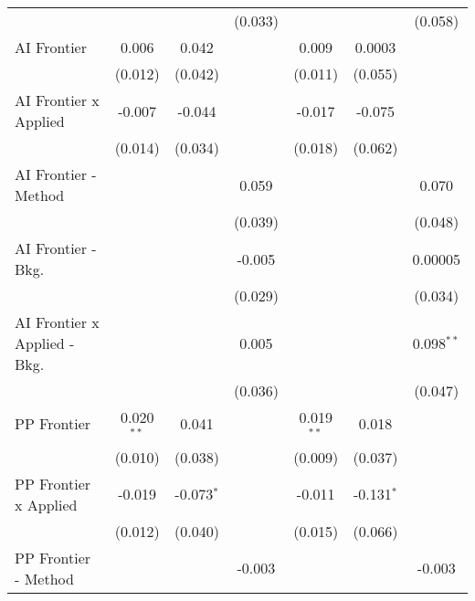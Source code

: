 \begin{tabular}{lcccccc}
                                  &                &               & (0.033)       &                &               & (0.058)\\   
   AI Frontier                    & 0.006          & 0.042         &               & 0.009          & 0.0003        &   \\   
                                  & (0.012)        & (0.042)       &               & (0.011)        & (0.055)       &   \\   
   AI Frontier x Applied          & -0.007         & -0.044        &               & -0.017         & -0.075        &   \\   
                                  & (0.014)        & (0.034)       &               & (0.018)        & (0.062)       &   \\   
   AI Frontier - Method           &                &               & 0.059         &                &               & 0.070\\   
                                  &                &               & (0.039)       &                &               & (0.048)\\   
   AI Frontier - Bkg.             &                &               & -0.005        &                &               & 0.00005\\   
                                  &                &               & (0.029)       &                &               & (0.034)\\   
   AI Frontier x Applied - Bkg.   &                &               & 0.005         &                &               & 0.098$^{**}$\\   
                                  &                &               & (0.036)       &                &               & (0.047)\\   
   PP Frontier                    & 0.020$^{**}$   & 0.041         &               & 0.019$^{**}$   & 0.018         &   \\   
                                  & (0.010)        & (0.038)       &               & (0.009)        & (0.037)       &   \\   
   PP Frontier x Applied          & -0.019         & -0.073$^{*}$  &               & -0.011         & -0.131$^{*}$  &   \\   
                                  & (0.012)        & (0.040)       &               & (0.015)        & (0.066)       &   \\   
   PP Frontier - Method           &                &               & -0.003        &                &               & -0.003\\   

\end{tabular}

